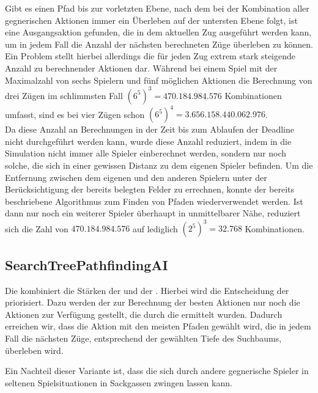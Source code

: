 Gibt es einen Pfad bis zur vorletzten Ebene, nach dem bei der Kombination aller gegnerischen Aktionen immer ein
Überleben auf der untersten Ebene folgt, ist eine Ausgangsaktion gefunden, die in dem aktuellen Zug ausgeführt werden
kann, um in jedem Fall die Anzahl der nächsten berechneten Züge überleben zu können. \\

Ein Problem stellt hierbei allerdings die für jeden Zug extrem stark steigende Anzahl zu berechnender Aktionen dar.
Während bei einem Spiel mit der Maximalzahl von sechs Spielern und fünf möglichen Aktionen die Berechnung von drei Zügen
im schlimmsten Fall $(6 ^ 5) ^ 3 = 470.184.984.576$ Kombinationen umfasst, sind es bei vier Zügen schon
$(6 ^ 5) ^ 4 = 3.656.158.440.062.976$. \\

Da diese Anzahl an Berechnungen in der Zeit bis zum Ablaufen der Deadline nicht durchgeführt werden kann, wurde diese
Anzahl reduziert, indem in die Simulation nicht immer alle Spieler einberechnet werden, sondern nur noch solche,
die sich in einer gewissen Distanz zu dem eigenen Spieler befinden.
Um die Entfernung zwischen dem eigenen und den anderen Spielern unter der Berücksichtigung der bereits belegten Felder
zu errechnen, konnte der bereits beschriebene Algorithmus zum Finden von Pfaden wiederverwendet werden.
Ist dann \bspw nur noch ein weiterer Spieler überhaupt in unmittelbarer Nähe, reduziert sich die Zahl von
$470.184.984.576$ auf lediglich $(2 ^ 5) ^ 3 = 32.768$ Kombinationen.

\subsection{SearchTreePathfindingAI}
\label{subsec:searchtree-pathfinding-ai}

Die  kombiniert die Stärken der  und der .
Hierbei wird die Entscheidung der  priorisiert.
Dazu werden der  zur Berechnung der besten Aktionen nur noch die Aktionen zur Verfügung gestellt, die
durch die  ermittelt wurden.
Dadurch erreichen wir, dass die Aktion mit den meisten Pfaden gewählt wird, die in jedem Fall die nächsten Züge,
entsprechend der gewählten Tiefe des Suchbaums, überleben wird.

Ein Nachteil dieser Variante ist, dass die  sich durch andere gegnerische Spieler in
seltenen Spielsituationen in Sackgassen zwingen lassen kann.

